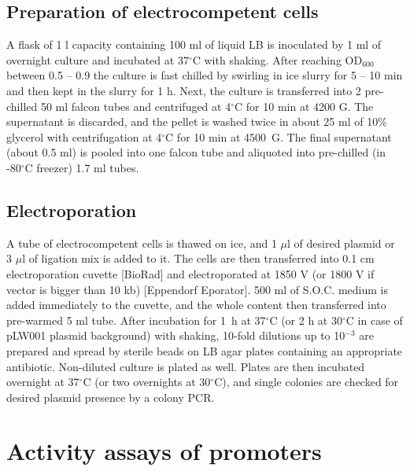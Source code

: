 \subsection{Preparation of electrocompetent cells}
A flask of 1 l capacity containing 100 ml of liquid LB is inoculated by 1 ml of overnight culture and incubated at 37$^{\circ}$C with shaking.
After reaching OD$_{600}$ between 0.5 -- 0.9 the culture is fast chilled by swirling in ice slurry for 5 -- 10 min and then kept in the slurry for 1 h.
Next, the culture is transferred into 2 pre-chilled 50 ml falcon tubes and centrifuged at 4$^{\circ}$C for 10 min at 4200 G.
The supernatant is discarded, and the pellet is washed twice in about 25 ml of 10\% glycerol with centrifugation at 4$^{\circ}$C for 10 min at 4500~G.
The final supernatant (about 0.5 ml) is pooled into one falcon tube and aliquoted into pre-chilled (in -80$^{\circ}$C freezer) 1.7 ml tubes.

\subsection{Electroporation}
A tube of electrocompetent cells is thawed on ice, and 1 $\mu$l of desired plasmid or 3 $\mu$l of ligation mix is added to it.
The cells are then transferred into 0.1 cm electroporation cuvette [BioRad] and electroporated at 1850 V (or 1800 V if vector is bigger than 10 kb) [Eppendorf Eporator\textsuperscript{\textregistered}].
500 ml of S.O.C. medium is added immediately to the cuvette, and the whole content then transferred into pre-warmed 5 ml tube.
After incubation for 1~h at 37$^{\circ}$C (or 2 h at 30$^{\circ}$C in case of pLW001 plasmid background) with shaking, 10-fold dilutions up to 10$^{-3}$ are prepared and spread by sterile beads on LB agar plates containing an appropriate antibiotic.
Non-diluted culture is plated as well.
Plates are then incubated overnight at 37$^{\circ}$C (or two overnights at 30$^{\circ}$C), and single colonies are checked for desired plasmid presence by a colony PCR.


\hypertarget{FC}{\section{Activity assays of promoters}}
